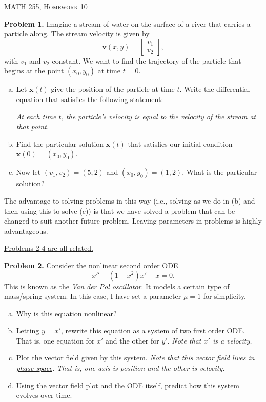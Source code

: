 \documentclass[12pt]{report} %
\theoremstyle{definition}
\begin{document}
\begin{center}
   \textsc{\large MATH 255, Homework 10}\\
\end{center}
\vspace{.5cm}

\noindent\textbf{Problem 1.} Imagine a stream of water on the surface of a river that carries a particle along. The stream velocity is given by
\[
\mathbf{v}(x,y)=\begin{bmatrix} v_1 \\ v_2 \end{bmatrix},
\]
with $v_1$ and $v_2$ constant. We want to find the trajectory of the particle that begins at the point $(x_0,y_0)$ at time $t=0$.
\begin{enumerate}[(a)]
    \item Let $\mathbf{x}(t)$ give the position of the particle at time $t$. Write the differential equation that satisfies the following statement:
    
    \emph{At each time $t$, the particle's velocity is equal to the velocity of the stream at that point.}
    
    \item Find the particular solution $\mathbf{x}(t)$ that satisfies our initial condition $\mathbf{x}(0)=(x_0,y_0)$.
    
    \item Now let $(v_1,v_2)=(5,2)$ and $(x_0,y_0)=(1,2)$.  What is the particular solution? 
\end{enumerate}
The advantage to solving problems in this way (i.e., solving as we do in (b) and then using this to solve (c)) is that we have solved a problem that can be changed to suit another future problem.  Leaving parameters in problems is highly advantageous.

\begin{center}\underline{Problems 2-4 are all related.}
\end{center}

\noindent\textbf{Problem 2.} Consider the nonlinear second order ODE 
\[
x''- (1-x^2)x'+x = 0.
\]
This is known as the \emph{Van der Pol oscillator}. It models a certain type of mass/spring system. In this case, I have set a parameter $\mu=1$ for simplicity.
\begin{enumerate}[(a)]
    \item Why is this equation nonlinear?
    \item Letting $y=x'$, rewrite this equation as a system of two first order ODE. That is, one equation for $x'$ and the other for $y'$. \emph{Note that $x'$ is a velocity.}
    \item Plot the vector field given by this system. \emph{Note that this vector field lives in \underline{phase space}. That is, one axis is position and the other is velocity.}
    \item Using the vector field plot and the ODE itself, predict how this system evolves over time. 
\end{enumerate}
\vspace*{.5cm}
\end{document}
